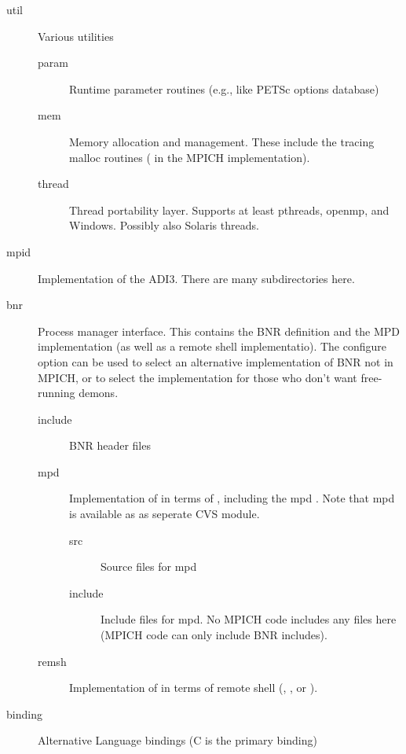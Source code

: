 \documentclass{article}
\begin{document}
\begin{description}
\begin{description}
  \item[util]Various utilities
    \begin{description}
    \item[param]Runtime parameter routines (e.g., like PETSc options database)
    \item[mem]Memory allocation and management.  These include the tracing
      malloc routines ( in the MPICH implementation).
    \item[thread]Thread portability layer.  Supports at least pthreads,
      openmp, and Windows.  Possibly also Solaris threads.
    \end{description}
  \item[mpid]Implementation of the ADI3.  There are many subdirectories here.
  \item[bnr]Process manager interface.  This contains the BNR
      definition and the MPD implementation (as well as a remote shell
      implementatio).  The configure option
       can be used to select an alternative
      implementation of BNR not in MPICH, or to select the
       implementation for those who don't want
      free-running demons.
    \begin{description}
      \item[include]BNR header files
      \item[mpd]Implementation of  in terms of , 
        including the mpd .  Note that mpd is available as
        as seperate CVS module.
        \begin{description}
          \item[src]Source files for mpd
          \item[include]Include files for mpd.  No MPICH code includes
    any files here (MPICH code can only include BNR includes).
        \end{description}
      \item[remsh]Implementation of  in terms of remote
      shell (, , or ).
    \end{description}
  \item[binding]Alternative Language bindings (C is the primary binding)

\end{description}
\end{description}
\end{document}
